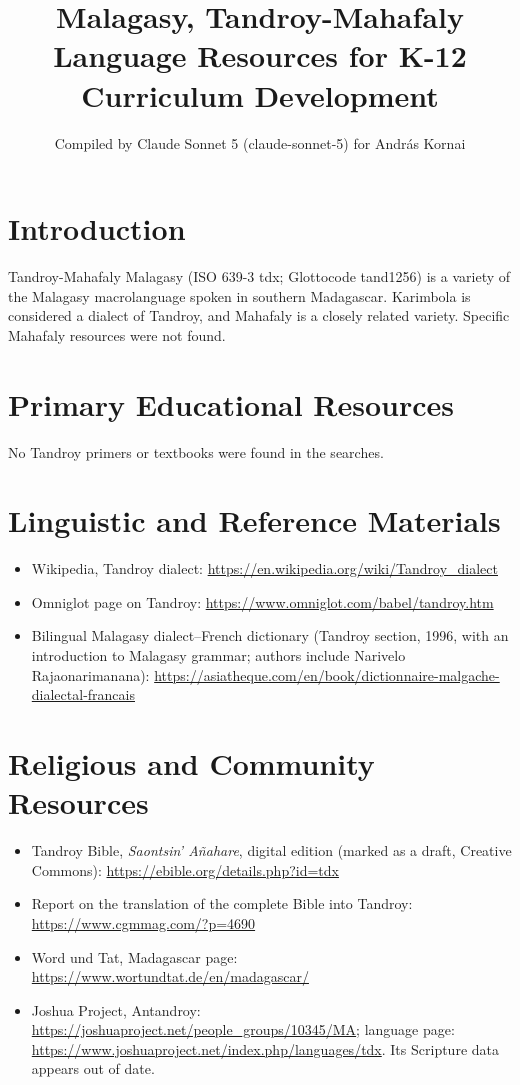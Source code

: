 \documentclass[12pt]{article}
\title{Malagasy, Tandroy-Mahafaly Language Resources for K-12 Curriculum Development}
\author{Compiled by Claude Sonnet 5 (claude-sonnet-5) for Andr\'as Kornai}
\date{}
\begin{document}
\maketitle

\section{Introduction}
Tandroy-Mahafaly Malagasy (ISO 639-3 tdx; Glottocode tand1256) is a variety of the Malagasy macrolanguage spoken in southern Madagascar. Karimbola is considered a dialect of Tandroy, and Mahafaly is a closely related variety. Specific Mahafaly resources were not found.

\section{Primary Educational Resources}
No Tandroy primers or textbooks were found in the searches.

\section{Linguistic and Reference Materials}
\begin{itemize}
\item Wikipedia, Tandroy dialect: \url{https://en.wikipedia.org/wiki/Tandroy_dialect}
\item Omniglot page on Tandroy: \url{https://www.omniglot.com/babel/tandroy.htm}
\item Bilingual Malagasy dialect--French dictionary (Tandroy section, 1996, with an introduction to Malagasy grammar; authors include Narivelo Rajaonarimanana): \url{https://asiatheque.com/en/book/dictionnaire-malgache-dialectal-francais}
\end{itemize}

\section{Religious and Community Resources}
\begin{itemize}
\item Tandroy Bible, \textit{Saontsin' A\~nahare}, digital edition (marked as a draft, Creative Commons): \url{https://ebible.org/details.php?id=tdx}
\item Report on the translation of the complete Bible into Tandroy: \url{https://www.cgmmag.com/?p=4690}
\item Word und Tat, Madagascar page: \url{https://www.wortundtat.de/en/madagascar/}
\item Joshua Project, Antandroy: \url{https://joshuaproject.net/people_groups/10345/MA}; language page: \url{https://www.joshuaproject.net/index.php/languages/tdx}. Its Scripture data appears out of date.
\end{itemize}
\end{document}
